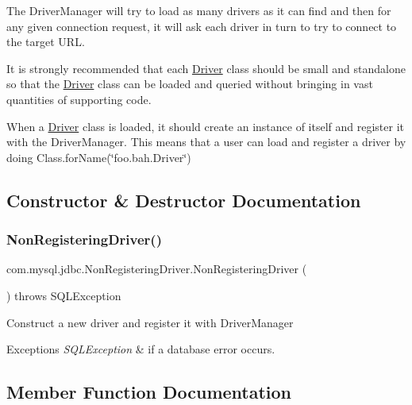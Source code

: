 The Driver\+Manager will try to load as many drivers as it can find and then for any given connection request, it will ask each driver in turn to try to connect to the target U\+RL. 

It is strongly recommended that each \mbox{\hyperlink{classcom_1_1mysql_1_1jdbc_1_1_driver}{Driver}} class should be small and standalone so that the \mbox{\hyperlink{classcom_1_1mysql_1_1jdbc_1_1_driver}{Driver}} class can be loaded and queried without bringing in vast quantities of supporting code. 

When a \mbox{\hyperlink{classcom_1_1mysql_1_1jdbc_1_1_driver}{Driver}} class is loaded, it should create an instance of itself and register it with the Driver\+Manager. This means that a user can load and register a driver by doing Class.\+for\+Name(\char`\"{}foo.\+bah.\+Driver\char`\"{}) 

\subsection{Constructor \& Destructor Documentation}
\mbox{\label{classcom_1_1mysql_1_1jdbc_1_1_non_registering_driver_ad16f3c604c147f06e5c90e626e9975bd}} 
\subsubsection{\texorpdfstring{Non\+Registering\+Driver()}{NonRegisteringDriver()}}
{\footnotesize\ttfamily com.\+mysql.\+jdbc.\+Non\+Registering\+Driver.\+Non\+Registering\+Driver (\begin{DoxyParamCaption}{ }\end{DoxyParamCaption}) throws S\+Q\+L\+Exception}

Construct a new driver and register it with Driver\+Manager


\begin{DoxyExceptions}{Exceptions}
{\em S\+Q\+L\+Exception} & if a database error occurs. \\
\hline
\end{DoxyExceptions}


\subsection{Member Function Documentation}
\mbox{\label{classcom_1_1mysql_1_1jdbc_1_1_non_registering_driver_abe7a0b5bf395ae24c4346d6bab87a0be}} 
